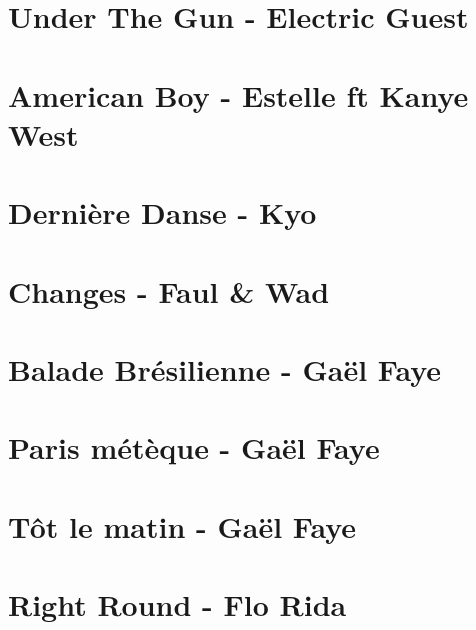 \documentclass[11pt]{article}
\begin{document}
\section{Under The Gun - Electric Guest}
\begin{guitar}

\end{guitar}


\section{American Boy - Estelle ft Kanye West}


\section{Dernière Danse - Kyo}
\begin{guitar}

\end{guitar}


\section{Changes - Faul \& Wad}
\begin{guitar}

\end{guitar}

\section{Balade Brésilienne - Gaël Faye}
\begin{guitar}

\end{guitar}


\section{Paris métèque - Gaël Faye}
\begin{guitar}

\end{guitar}


\section{Tôt le matin - Gaël Faye}
\begin{guitar}

\end{guitar}

\section{Right Round - Flo Rida}
\begin{guitar}

\end{guitar}
\end{document}
